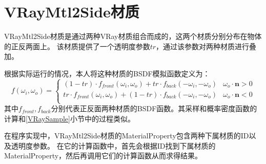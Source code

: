 \section{VRayMtl2Side材质}

VRayMtl2Side材质是通过两种VRay材质组合而成的，这两个材质分别分布在物体的正反两面上。
该材质提供了一个透明度参数$tr$，通过该参数对两种材质进行叠加。

根据实际运行的情况，本人将这种材质的BSDF模拟函数定义为：
\begin{equation}
    f(\omega_i, \omega_o) = 
    \begin{cases}
    (1-tr)\cdot f_{front}(\omega_i, \omega_o)+tr\cdot f_{back}(-\omega_i, -\omega_o)& \omega_o \cdot \textbf{n} > 0\\
    tr\cdot f_{front}(\omega_i, \omega_o)+(1-tr)\cdot f_{back}(-\omega_i, -\omega_o)& \omega_o \cdot \textbf{n} < 0\\
    \end{cases}
\end{equation}
其中$f_{front},f_{back}$分别代表正反面两种材质的BSDF函数。其采样和概率密度函数的计算和\ref{VRaySample}小节中的过程类似。

在程序实现中，VRayMtl2Side材质的MaterialProperty包含两种下属材质的ID以及透明度参数。
在它的计算函数中，首先会根据ID找到下属材质的MaterialProperty，然后再调用它们的计算函数从而求得结果。

